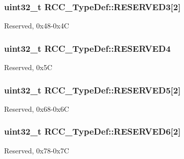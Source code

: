 \subsubsection[{\texorpdfstring{R\+E\+S\+E\+R\+V\+E\+D3}{RESERVED3}}]{\setlength{\rightskip}{0pt plus 5cm}uint32\+\_\+t R\+C\+C\+\_\+\+Type\+Def\+::\+R\+E\+S\+E\+R\+V\+E\+D3\mbox{[}2\mbox{]}}\hypertarget{struct_r_c_c___type_def_a74071ea325d6bc064817ed0a7a4d7def}{}\label{struct_r_c_c___type_def_a74071ea325d6bc064817ed0a7a4d7def}
Reserved, 0x48-\/0x4C 
\subsubsection[{\texorpdfstring{R\+E\+S\+E\+R\+V\+E\+D4}{RESERVED4}}]{\setlength{\rightskip}{0pt plus 5cm}uint32\+\_\+t R\+C\+C\+\_\+\+Type\+Def\+::\+R\+E\+S\+E\+R\+V\+E\+D4}\hypertarget{struct_r_c_c___type_def_a0f009e4bd1777ac1b86ca27e23361a0e}{}\label{struct_r_c_c___type_def_a0f009e4bd1777ac1b86ca27e23361a0e}
Reserved, 0x5C 
\subsubsection[{\texorpdfstring{R\+E\+S\+E\+R\+V\+E\+D5}{RESERVED5}}]{\setlength{\rightskip}{0pt plus 5cm}uint32\+\_\+t R\+C\+C\+\_\+\+Type\+Def\+::\+R\+E\+S\+E\+R\+V\+E\+D5\mbox{[}2\mbox{]}}\hypertarget{struct_r_c_c___type_def_af9159a971013ef0592be8be3e256a344}{}\label{struct_r_c_c___type_def_af9159a971013ef0592be8be3e256a344}
Reserved, 0x68-\/0x6C 
\subsubsection[{\texorpdfstring{R\+E\+S\+E\+R\+V\+E\+D6}{RESERVED6}}]{\setlength{\rightskip}{0pt plus 5cm}uint32\+\_\+t R\+C\+C\+\_\+\+Type\+Def\+::\+R\+E\+S\+E\+R\+V\+E\+D6\mbox{[}2\mbox{]}}\hypertarget{struct_r_c_c___type_def_a30cfd1a2f2eb931bacfd2be965e53d1b}{}\label{struct_r_c_c___type_def_a30cfd1a2f2eb931bacfd2be965e53d1b}
Reserved, 0x78-\/0x7C 
